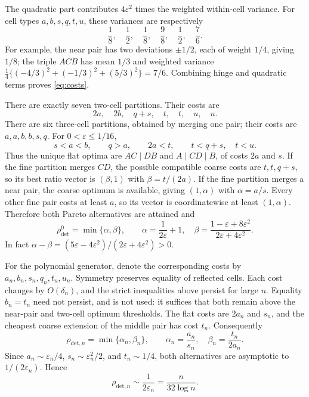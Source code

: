 \documentclass[11pt]{article}
\theoremstyle{definition}\newtheorem{definition}[theorem]{Definition}
\theoremstyle{remark}\newtheorem{remark}[theorem]{Remark}
\newcommand{\detp}{\mathrm{det}}
\begin{document}
The quadratic part contributes $4\varepsilon^2$ times the weighted within-cell variance. For cell types $a,b,s,q,t,u$, these variances are respectively
\[
\frac18,\quad\frac12,\quad\frac18,\quad\frac98,\quad\frac12,\quad\frac76.
\]
For example, the near pair has two deviations $\pm1/2$, each of weight $1/4$, giving $1/8$; the triple $ACB$ has mean $1/3$ and weighted variance
$\tfrac14\{(-4/3)^2+(-1/3)^2+(5/3)^2\}=7/6$.
Combining hinge and quadratic terms proves \eqref{eq:costs}.

There are exactly seven two-cell partitions. Their costs are
\[
2a,\quad2b,\quad q+s,\quad t,\quad t,\quad u,\quad u.
\]
There are six three-cell partitions, obtained by merging one pair; their costs are $a,a,b,b,s,q$. For $0<\varepsilon\le1/16$,
\[
s<a<b,\qquad q>a,\qquad2a<t,\qquad t<q+s,\quad t<u.
\]
Thus the unique flat optima are $AC\mid DB$ and $A\mid CD\mid B$, of costs $2a$ and $s$. If the fine partition merges $CD$, the possible compatible coarse costs are $t,t,q+s$, so its best ratio vector is $(\beta,1)$ with $\beta=t/(2a)$. If the fine partition merges a near pair, the coarse optimum is available, giving $(1,\alpha)$ with $\alpha=a/s$. Every other fine pair costs at least $a$, so its vector is coordinatewise at least $(1,\alpha)$. Therefore both Pareto alternatives are attained and
\begin{equation}
\rho_{\detp}^0=\min\{\alpha,\beta\},\qquad
\alpha=\frac1{2\varepsilon}+1,\quad
\beta=\frac{1-\varepsilon+8\varepsilon^2}{2\varepsilon+4\varepsilon^2}.
\label{eq:paretoideal}
\end{equation}
In fact $\alpha-\beta=(5\varepsilon-4\varepsilon^2)/(2\varepsilon+4\varepsilon^2)>0$.

For the polynomial generator, denote the corresponding costs by $a_n,b_n,s_n,q_n,t_n,u_n$. Symmetry preserves equality of reflected cells. Each cost changes by $O(\delta_n)$, and the strict inequalities above persist for large $n$. Equality $b_n=t_n$ need not persist, and is not used: it suffices that both remain above the near-pair and two-cell optimum thresholds. The flat costs are $2a_n$ and $s_n$, and the cheapest coarse extension of the middle pair has cost $t_n$. Consequently
\begin{equation}
\rho_{\detp,n}=\min\{\alpha_n,\beta_n\},\qquad
\alpha_n=\frac{a_n}{s_n},\quad\beta_n=\frac{t_n}{2a_n}.
\label{eq:paretopoly}
\end{equation}
Since $a_n\sim\varepsilon_n/4$, $s_n\sim\varepsilon_n^2/2$, and $t_n\sim1/4$, both alternatives are asymptotic to $1/(2\varepsilon_n)$. Hence
\begin{equation}
\rho_{\detp,n}\sim\frac1{2\varepsilon_n}=\frac{n}{32\log n}.
\label{eq:detasymptotic}
\end{equation}
\end{document}
